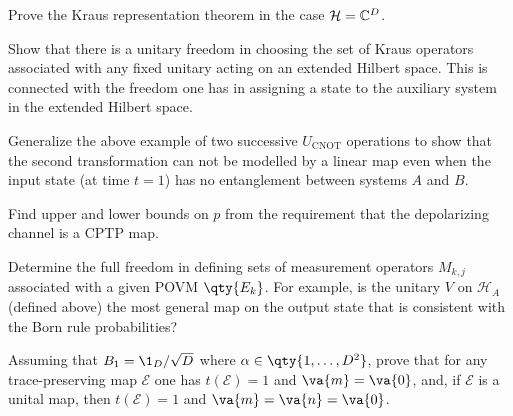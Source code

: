 \documentclass[
	pages,
	boxes,
	color=RoyalPurple
]{homework}
\makeatletter
\numberwithin{tcb@cnt@prob}{section}
\makeatother
\begin{document}
\setcounter{section}{11}

\begin{problem}
Prove the Kraus representation theorem in the case $\mathcal{H} = \mathbb{C}^D$.
\end{problem}

\begin{solution}
\end{solution}

\begin{problem}
Show that there is a unitary freedom in choosing the set of Kraus operators associated with any fixed unitary acting on an extended Hilbert space. This is connected with the freedom one has in assigning a state to the auxiliary system in the extended Hilbert space.
\end{problem}

\begin{solution}
\end{solution}

\begin{problem}
Generalize the above example of two successive $U_\text{CNOT}$ operations to show that the second transformation can not be modelled by a linear map even when the input state (at time $t = 1$) has no entanglement between systems $A$ and $B$.
\end{problem}

\begin{solution}
\end{solution}

\begin{problem}
Find upper and lower bounds on $p$ from the requirement that the depolarizing channel is a CPTP map.
\end{problem}

\begin{solution}
\end{solution}

\setcounter{section}{12}
\begin{problem}
Determine the full freedom in defining sets of measurement operators $M_{k,j}$ associated with a given POVM $\qty{E_k}$. For example, is the unitary $V$ on $\mathcal{H}_A$ (defined above) the most general map on the output state that is consistent with the Born rule probabilities?
\end{problem}

\begin{solution}
\end{solution}

\setcounter{section}{15}
\begin{problem}
Assuming that $B_1 = \1_D / \sqrt{D}$ where $\alpha\in\qty{1,\ldots,D^2}$, prove that for any trace-preserving map $\mathcal{E}$ one has $t(\mathcal{E}) = 1$ and $\va{m} = \va{0}$, and, if $\mathcal{E}$ is a unital map, then $t(\mathcal{E}) = 1$ and $\va{m} = \va{n} = \va{0}$.
\end{problem}

\begin{solution}
\end{solution}
\end{document}
